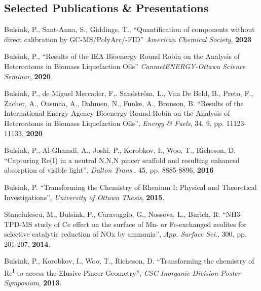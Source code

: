 \documentclass[margin,line]{resumecls}
\begin{document}
\begin{resume}
    \section{\mysidestyle Selected Publications \& Presentations}
    Bulsink, P., Sant-Anna, S., Giddings, T., ``Quantification of components without direct calibration by GC-MS/PolyArc\textsuperscript \textregistered /-FID'' \textit{American Chemical Society}, \textbf{2023}

    \vspace{0mm}
    Bulsink, P., ``Results of the IEA Bioenergy Round Robin on the Analysis of Heteroatoms in Biomass Liquefaction Oils'' \textit{CanmetENERGY-Ottawa Science Seminar}, \textbf{2020}

    \vspace{0mm}
    Bulsink, P., de Miguel Mercader, F,. Sandstr\"{o}m, L., Van De Beld, B., Preto, F., Zacher, A., Oasmaa, A., Dahmen, N., Funke, A., Bronson, B. ``Results of the International Energy Agency Bioenergy Round Robin on the Analysis of Heteroatoms in Biomass Liquefaction Oils'', \textit{Energy \& Fuels}, 34, 9, pp. 11123-11133, \textbf{2020}

    \vspace{0mm}
    Bulsink, P., Al-Ghamdi, A., Joshi, P., Korobkov, I., Woo, T., Richeson, D. ``Capturing Re(I) in a neutral N,N,N pincer scaffold and resulting enhanced absorption of visible light'', \textit{Dalton Trans.}, 45, pp. 8885-8896, \textbf{2016}

     \vspace{0mm}
    Bulsink, P. ``Transforming the Chemistry of Rhenium I: Physical and Theoretical Investigations'', \textit{University of Ottawa Thesis}, \textbf{2015}.

 	\vspace{0mm}
    Stanciulescu, M., Bulsink, P., Caravaggio, G., Nossova, L., Burich, R. ``NH3-TPD-MS study of Ce effect on the surface of Mn- or Fe-exchanged zeolites for selective catalytic reduction of NOx by ammonia'', \textit{App. Surface Sci.}, 300, pp. 201-207, \textbf{2014}.

	\vspace{0mm}
    Bulsink, P., Korobkov, I., Woo, T., Richeson, D. ``Transforming the chemistry of Re\textsuperscript{I} to access the Elusive Pincer Geometry'', \textit{CSC Inorganic Division Poster Symposium}, \textbf{2013}.


\end{resume}
\end{document}

